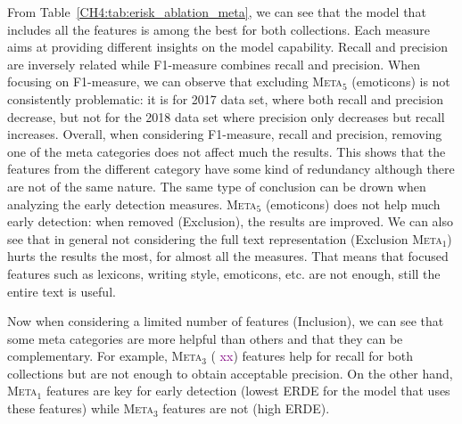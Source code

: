 \documentclass[graybox]{svmult}
\newcommand{\jm}[1]{\textcolor{purple}{{  #1}}}
\begin{document}
From Table~\ref{CH4:tab:erisk_ablation_meta}, we can see that the model that includes all the features is among the best for both collections. Each measure aims at providing different insights on the model capability. Recall and precision are inversely related while F1-measure combines recall and precision. When focusing on F1-measure, we can observe that excluding {\scshape Meta$_{5}$} (emoticons) is not consistently problematic: it is for 2017 data set, where both recall and precision decrease, but not for the 2018 data set where precision only decreases but recall increases. Overall, when considering F1-measure, recall and precision, removing one of the meta categories does not affect much the results. This shows that the features from the different category have some kind of redundancy although there are not of the same nature. The same type of conclusion can be drown when analyzing the early detection measures.  {\scshape Meta$_{5}$} (emoticons) does not help much early detection: when removed (Exclusion), the results are improved. We can also see that in general not considering the full text representation  (Exclusion {\scshape Meta$_{1}$}) hurts the results the most, for almost all the measures. That means that focused features such as lexicons, writing style, emoticons, etc. are not enough, still the entire text is useful.

Now when considering a limited number of features (Inclusion), we can see that some meta categories are  more helpful than others and that they can be complementary. For example, {\scshape Meta$_{3}$} (\jm{xx}) features help for  recall for both collections but are not enough to obtain acceptable precision. On the other hand, {\scshape Meta$_{1}$} features are key for early detection (lowest ERDE for the model that uses these features) while {\scshape Meta$_{3}$}  features are not (high ERDE).
\end{document}

